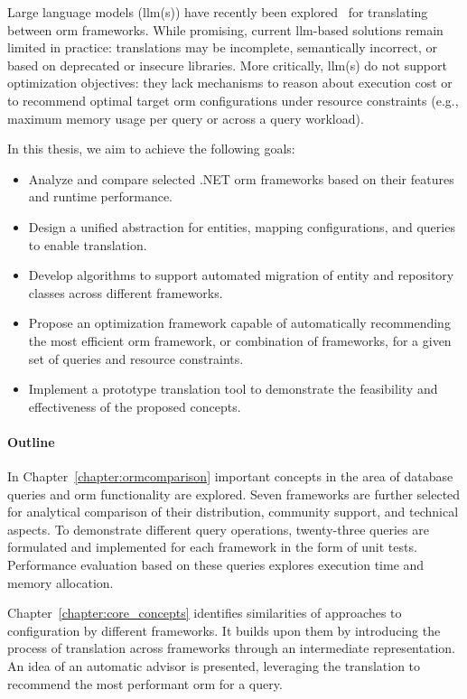 Large language models (\acrshort{llm}(s)) have recently been explored~\cite{TODO} for translating between \acrshort{orm} frameworks. While promising, current \acrshort{llm}-based solutions remain limited in practice: translations may be incomplete, semantically incorrect, or based on deprecated or insecure libraries. More critically, \acrshort{llm}(s) do not support optimization objectives: they lack mechanisms to reason about execution cost or to recommend optimal target \acrshort{orm} configurations under resource constraints (e.g., maximum memory usage per query or across a query workload).

In this thesis, we aim to achieve the following goals:
\begin{itemize}
    \item Analyze and compare selected .NET \acrshort{orm} frameworks based on their features and runtime performance.
    \item Design a unified abstraction for entities, mapping configurations, and queries to enable translation.
    \item Develop algorithms to support automated migration of entity and repository classes across different frameworks.
    \item Propose an optimization framework capable of automatically recommending the most efficient \acrshort{orm} framework, or combination of frameworks, for a given set of queries and resource constraints.
    \item Implement a prototype translation tool to demonstrate the feasibility and effectiveness of the proposed concepts.
\end{itemize}

\paragraph{Outline} In Chapter~\ref{chapter:ormcomparison} important concepts in the area of database queries and \acrshort{orm} functionality are explored. Seven frameworks are further selected for analytical comparison of their distribution, community support, and technical aspects. To demonstrate different query operations, twenty-three queries are formulated and implemented for each framework in the form of unit tests. Performance evaluation based on these queries explores execution time and memory allocation.

Chapter~\ref{chapter:core_concepts} identifies similarities of approaches to configuration by different frameworks. It builds upon them by introducing the process of translation across frameworks through an intermediate representation. An idea of an automatic advisor is presented, leveraging the translation to recommend the most performant \acrshort{orm} for a query.

